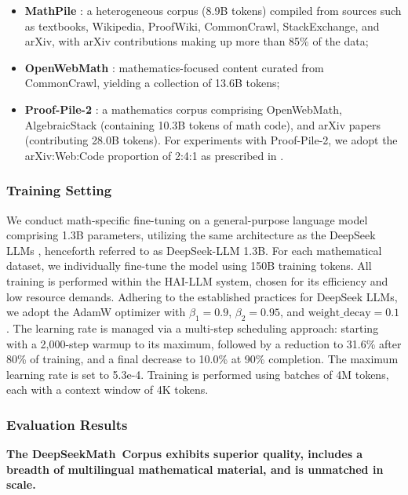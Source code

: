 \begin{itemize}[topsep=0pt]
    \item \textbf{MathPile} \citep{mathpile}: a heterogeneous corpus (8.9B tokens) compiled from sources such as textbooks, Wikipedia, ProofWiki, CommonCrawl, StackExchange, and arXiv, with arXiv contributions making up more than 85\% of the data;
    \item \textbf{OpenWebMath} \citep{openwebmath}: mathematics-focused content curated from CommonCrawl, yielding a collection of 13.6B tokens;
    \item \textbf{Proof-Pile-2} \citep{llemma}: a mathematics corpus comprising OpenWebMath, AlgebraicStack (containing 10.3B tokens of math code), and arXiv papers (contributing 28.0B tokens). For experiments with Proof-Pile-2, we adopt the arXiv:Web:Code proportion of 2:4:1 as prescribed in \cite{llemma}.
\end{itemize}

\subsubsection{Training Setting}
\label{sec:quality-policy}
We conduct math-specific fine-tuning on a general-purpose language model comprising 1.3B parameters, utilizing the same architecture as the DeepSeek LLMs \citep{deepseek-llm}, henceforth referred to as DeepSeek-LLM 1.3B. For each mathematical dataset, we individually fine-tune the model using 150B training tokens. All training is performed within the HAI-LLM \citep{haillm} system, chosen for its efficiency and low resource demands. Adhering to the established practices for DeepSeek LLMs, we adopt the AdamW optimizer \citep{adamW} with $\beta_1=0.9$, $\beta_2=0.95$, and $\mathrm{weight\_decay}=0.1$. The learning rate is managed via a multi-step scheduling approach: starting with a 2,000-step warmup to its maximum, followed by a reduction to 31.6\% after 80\% of training, and a final decrease to 10.0\% at 90\% completion. The maximum learning rate is set to 5.3e-4. Training is performed using batches of 4M tokens, each with a context window of 4K tokens.

\subsubsection{Evaluation Results}

\textbf{The DeepSeekMath~Corpus exhibits superior quality, includes a breadth of multilingual mathematical material, and is unmatched in scale.}

